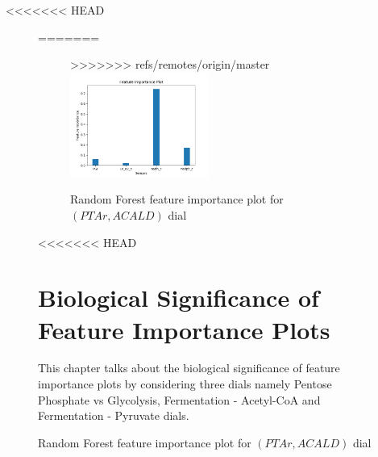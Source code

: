 \documentclass[12pt,chapterheads]{ucsd}
\begin{document}
<<<<<<< HEAD
\begin{figure}[h!] 
=======
\begin{figure}[h] 
>>>>>>> refs/remotes/origin/master
\centering
\includegraphics[width=0.5\textwidth]{PTAr_ACALD_rfr_important_features}
\caption[Random Forest feature importance plot for $(PTAr, ACALD)$ dial]
{Random Forest feature importance plot for $(PTAr, ACALD)$ dial}
\label{fig:PtarAcaldRfrImp}
\end{figure}
<<<<<<< HEAD

\chapter{Biological Significance of Feature Importance Plots}\label{chap:bioSig}
 This chapter talks about the biological significance of feature importance plots by considering three dials namely Pentose Phosphate vs Glycolysis, Fermentation - Acetyl-CoA and Fermentation - Pyruvate dials.

\end{figure}
\end{document}
